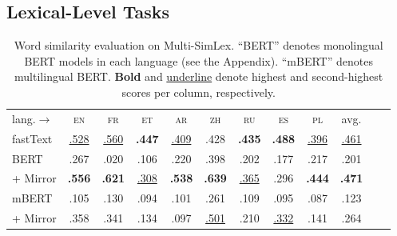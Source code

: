 \documentclass[11pt]{article}
\newcommand{\en}{{\textsc{en}}\xspace}
\newcommand{\es}{{\textsc{es}}\xspace}
\newcommand{\zh}{{\textsc{zh}}\xspace}
\newcommand{\ru}{{\textsc{ru}}\xspace}
\newcommand{\fr}{{\textsc{fr}}\xspace}
\newcommand{\et}{{\textsc{et}}\xspace}
\newcommand{\pl}{{\textsc{pl}}\xspace}
\newcommand{\ar}{{\textsc{ar}}\xspace}
\begin{document}
\subsection{Lexical-Level Tasks}
\label{ss:lexical}

\begin{table}[!t] \centering
\setlength{\tabcolsep}{3.8pt}
\renewcommand{\arraystretch}{0.85}
\scriptsize
\begin{tabular}{lccccccccccc}
\cmidrule[1.0pt]{1-10}
lang.$\rightarrow$ & \en & \fr & \et & \ar & \zh & \ru & \es & \pl & avg. \\
\cmidrule[1.0pt]{1-10}
fastText & \underline{.528} & \underline{.560} & \textbf{.447} & \underline{.409} & .428 & \textbf{.435} & \textbf{.488} & \underline{.396} & \underline{.461} \\
\cmidrule[1.0pt]{1-10}
BERT & .267 & .020 &.106 & .220 & .398 & .202 & .177 & .217 & .201 \\
\rowcolor{blue!10}
+ Mirror  & \textbf{.556} & \textbf{.621} & \underline{.308} & \textbf{.538} & \textbf{.639} & \underline{.365} & .296 & \textbf{.444} & \textbf{.471} \\
\cmidrule[1.0pt]{1-10}
mBERT & .105 & .130 &.094 & .101 & .261 & .109 & .095 & .087 & .123 \\
\rowcolor{blue!10}
+ Mirror & .358 & .341 & .134 & .097 & \underline{.501} & .210 & \underline{.332} & .141 & .264 \\
\cmidrule[1.0pt]{1-10}
\end{tabular}
\caption{Word similarity evaluation on Multi-SimLex. ``BERT'' denotes monolingual BERT models in each language (see the Appendix). ``mBERT'' denotes multilingual BERT. \textbf{Bold} and \underline{underline} denote highest and second-highest scores per column, respectively.}
\label{tab:ws}
\end{table}
\end{document}
